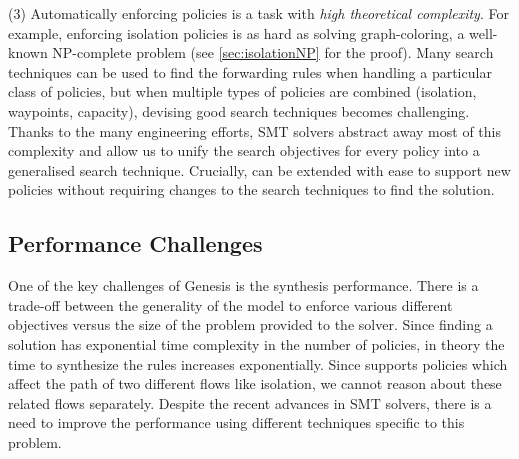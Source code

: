 (3) Automatically enforcing policies is a task with
\emph{high theoretical complexity}. 
For example, enforcing isolation policies
is as hard as solving
graph-coloring, a well-known
NP-complete problem (see \cref{sec:isolationNP} for the proof).
Many  search
techniques can be used to find the forwarding rules when handling
a particular class of policies, 
but when multiple types of policies are combined (isolation, waypoints, capacity),
devising good search techniques becomes challenging. 
Thanks to the many engineering efforts, SMT solvers abstract away
most of this complexity and allow us
 to unify the search objectives for every policy into a generalised
search technique. 
Crucially, \Name can be extended with ease to
support new policies without requiring changes to the search
techniques to find the solution.
\subsection{Performance Challenges} \label{sec:performance}

One of the key challenges of Genesis is the synthesis
performance. There is a trade-off between the generality of the model
to enforce various different objectives versus the size of the problem
provided to the solver.  Since finding a solution has exponential time
complexity in the number of policies, in theory the time to
synthesize the rules increases exponentially. Since \Name supports policies
 which affect the path of two different flows like isolation, we cannot
 reason about these related flows separately.  
Despite the recent advances in SMT solvers, there is a need to improve the performance
using different techniques specific to this problem.


